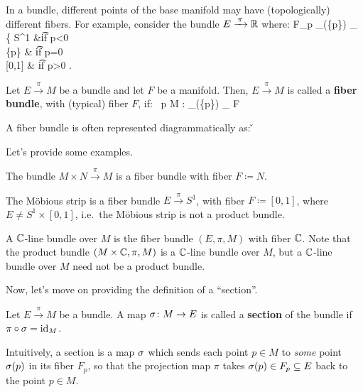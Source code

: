 \be
In a bundle, different points of the base manifold may have (topologically) different fibers. For example, consider
the bundle $E\xrightarrow{\,\pi\,}\mathbb{R}$ where:
\bse
F_p \coloneqq {}_\pi(\{p\}) \cong_ \left\{  S^1 &\t{if }p<0\\ \{p\} & \t{if }p=0\\ {}
[0,1] & \t{if } p>0 \ea \right.
\ese
\ee

Let $E\xrightarrow{\,\pi\,}M$ be a bundle and let $F$ be a manifold. Then, $E\xrightarrow{\,\pi\,}M$ is called a
\textbf{fiber bundle}, with (typical) fiber $F$, if:
\bse
\forall \, p \in M : _\pi(\{p\}) \cong_ F
\ese
\ed

A fiber bundle is often represented diagrammatically as: \v
\bse
{}
\ese

\v

Let's provide some examples.

\be
The bundle $M\times N\xrightarrow{\,\pi\,}M$ is a fiber bundle with fiber $F \coloneqq N$.
\ee

\be
The Möbious strip is a fiber bundle $E\xrightarrow{\,\pi\,}S^1$, with fiber $F \coloneqq [0,1]$, where $E\neq
S^1\times[0,1]$, i.e.\ the Möbious strip is not a product bundle.
\ee

\be
A $\mathbb{C}$-line bundle over $M$ is the fiber bundle $(E,\pi,M)$ with fiber $\mathbb{C}$. Note that the product bundle $(M\times
\mathbb{C},\pi,M)$ is a $\mathbb{C}$-line bundle over $M$, but a $\mathbb{C}$-line bundle over $M$ need not be a product bundle.
\ee

Now, let's move on providing the definition of a ``section''.

\bd [Section]
Let $E\xrightarrow{\,\pi\,}M$ be a bundle. A map $\sigma\colon M \to E$ is called a \textbf{section} of the bundle if
$\pi \circ \sigma = \operatorname{id}_M$.
\ed

Intuitively, a section is a map $\sigma$ which sends each point $p\in M$ to \emph{some} point $\sigma(p)$ in its fiber $F_p$,
so that the projection map $\pi$ takes $\sigma(p) \in F_p\subseteq E$ back to the point $p\in M$.

\vspace{25pt}


